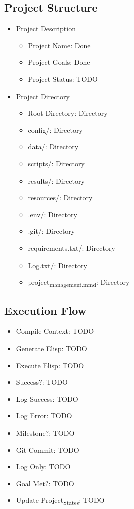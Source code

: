 \documentclass[11pt]{article}
\begin{document}
\subsection{Project Structure}
\label{sec:org9224060}
\begin{itemize}
\item Project Description
\begin{itemize}
\item Project Name: Done
\item Project Goals: Done
\item Project Status: TODO
\end{itemize}
\item Project Directory
\begin{itemize}
\item Root Directory: Directory
\item config/: Directory
\item data/: Directory
\item scripts/: Directory
\item results/: Directory
\item resources/: Directory
\item .env/: Directory
\item .git/: Directory
\item requirements.txt/: Directory
\item Log.txt/: Directory
\item project\textsubscript{management.mmd}: Directory
\end{itemize}
\end{itemize}

\subsection{Execution Flow}
\label{sec:org20a797e}
\begin{itemize}
\item Compile Context: TODO
\item Generate Elisp: TODO
\item Execute Elisp: TODO
\item Success?: TODO
\item Log Success: TODO
\item Log Error: TODO
\item Milestone?: TODO
\item Git Commit: TODO
\item Log Only: TODO
\item Goal Met?: TODO
\item Update Project\textsubscript{States}: TODO
\end{itemize}
\end{document}

